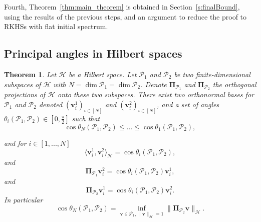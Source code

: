 \documentclass[twoside,11pt]{book}
\newtheorem{theorem}{Theorem}
\numberwithin{theorem}{chapter}
\numberwithin{definition}{chapter}
\numberwithin{proposition}{chapter}
\numberwithin{corollary}{chapter}
\numberwithin{example}{chapter}
\numberwithin{lemma}{chapter}
\numberwithin{assumption}{chapter}
\begin{document}
Fourth, Theorem~\ref{thm:main_theorem} is obtained in Section~\ref{s:finalBound}, using the results of the previous steps, and an argument to reduce the proof to RKHSs with flat initial spectrum.

\subsection{Principal angles in Hilbert spaces}\label{sec:proof_principal_angles}

\begin{theorem}\label{prop:cos_between_subspaces}
Let $\mathcal{H}$ be a Hilbert space. Let $\mathcal{P}_{1}$ and $\mathcal{P}_{2}$ be two finite-dimensional subspaces of $\mathcal{H}$ with $N = \dim \mathcal{P}_{1} = \dim \mathcal{P}_{2}$. Denote $\bm{\Pi}_{\mathcal{P}_{1}}$ and $\bm{\Pi}_{\mathcal{P}_{2}}$ the orthogonal projections of $\mathcal{H}$ onto these two subspaces. There exist two orthonormal bases for $\mathcal{P}_{1}$ and $\mathcal{P}_{2}$ denoted $(\bm{v}_{i}^{1})_{i \in [N]}$ and $(\bm{v}_{i}^{2})_{i \in [N]}$, and a set of angles $\theta_{i}(\mathcal{P}_{1},\mathcal{P}_{2}) \in [0,\frac{\pi}{2}]$ such that
\begin{equation}
\cos \theta_{N}(\mathcal{P}_{1},\mathcal{P}_{2}) \leq \dots \leq \cos \theta_{1}(\mathcal{P}_{1},\mathcal{P}_{2}) ,
\end{equation}

and for $i \in [1,...,N]$
\begin{equation}
\langle \bm{v}_{i}^{1}, \bm{v}_{i}^{2} \rangle_{\mathcal{H}} = \cos \theta_{i}(\mathcal{P}_{1},\mathcal{P}_{2}),
\end{equation}
and
\begin{equation}\label{eq:principal_vectors_projection_relationship}
 \bm{\Pi}_{\mathcal{P}_{1}}\bm{v}_{i}^{2} = \cos \theta_{i}(\mathcal{P}_{1},\mathcal{P}_{2}) \bm{v}_{i}^{1},
\end{equation}
and
\begin{equation}
 \bm{\Pi}_{\mathcal{P}_{2}}\bm{v}_{i}^{1} = \cos \theta_{i}(\mathcal{P}_{1},\mathcal{P}_{2}) \bm{v}_{i}^{2}.
\end{equation}
In particular
\begin{equation}\label{eq:costhetaN}
\cos \theta_{N}(\mathcal{P}_{1},\mathcal{P}_{2}) = \inf\limits_{\bm{v} \in \mathcal{P}_{1},\|\bm{v}\|_{\mathcal{H}} = 1} \|\bm{\Pi}_{\mathcal{P}_{2}}\bm{v}\|_{\mathcal{H}}.
\end{equation}
\end{theorem}
\end{document}
